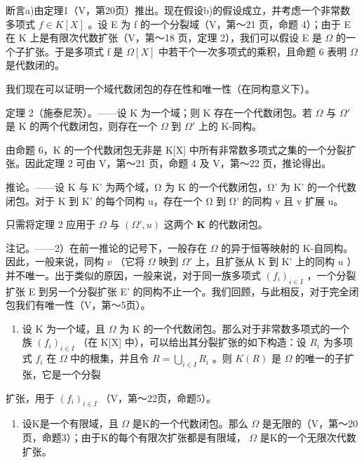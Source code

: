 断言a)由定理1（V，第20页）推出。现在假设b)的假设成立，并考虑一个非常数多项式 \(f \in K[X]\) 。设 E 为 f 的一个分裂域（V，第～21 页，命题 4）；由于 E 在 K 上是有限次代数扩张（V，第～18 页，定理 2），我们可以假设 E 是 \(\Omega\) 的一个子扩张。于是多项式 f 是 \(\Omega[X]\) 中若干个一次多项式的乘积，且命题 6 表明 \(\Omega\) 是代数闭的。

我们现在可以证明一个域代数闭包的存在性和唯一性（在同构意义下）。

定理 2（施泰尼茨）。——设 K 为一个域；则 K 存在一个代数闭包。若 \(\Omega\) 与 \(\Omega'\) 是 K 的两个代数闭包，则存在一个 \(\Omega\) 到 \(\Omega'\) 上的 K-同构。

由命题 6，K 的一个代数闭包无非是 K{[}X{]} 中所有非常数多项式之集的一个分裂扩张。因此定理 2 可由 V，第～21 页，命题 4 及 V，第～22 页，推论得出。

推论。——设 K 与 K' 为两个域，Ω 为 K 的一个代数闭包，Ω' 为 K' 的一个代数闭包。对于 K 到 K' 的每个同构 u，存在一个 Ω 到 Ω' 的同构 v 且 v 扩展 u。

只需将定理 2 应用于 \(\Omega\) 与 \((\Omega', u)\) 这两个 \(\mathbf{K}\) 的代数闭包。

注记。——2）在前一推论的记号下，一般存在 \(\Omega\) 的异于恒等映射的 K-自同构。因此，一般来说，同构 \(v\) （它将 \(\Omega\) 映到 \(\Omega'\) 上，且扩张从 K 到 K' 上的同构 \(u\) ）并不唯一。出于类似的原因，一般来说，对于同一族多项式 \((f_i)_{i \in I}\) ，一个分裂扩张 E 到另一个分裂扩张 E' 的同构不止一个。我们回顾，与此相反，对于完全闭包我们有唯一性（V，第～5页）。

\begin{enumerate}
\def\labelenumi{\arabic{enumi})}
\setcounter{enumi}{2}
\tightlist
\item
  设 K 为一个域，且 \(\Omega\) 为 K 的一个代数闭包。那么对于非常数多项式的一个族 \((f_{i})_{i\in I}\) （在 K{[}X{]} 中），可以给出其分裂扩张的如下构造：设 \(R_{i}\) 为多项式 \(f_{i}\) 在 \(\Omega\) 中的根集，并且令 \(R=\bigcup_{i\in I}R_{i}\) 。则 \(K(R)\) 是 \(\Omega\) 的唯一的子扩张，它是一个分裂
\end{enumerate}

扩张，用于 \((f_i)_{i\in I}\) （V，第～22页，命题5）。

\begin{enumerate}
\def\labelenumi{\arabic{enumi})}
\setcounter{enumi}{3}
\tightlist
\item
  设K是一个有限域，且 \(\Omega\) 是K的一个代数闭包。那么 \(\Omega\) 是无限的（V，第～20页，命题3）；由于K的每个有限次扩张都是有限域， \(\Omega\) 是K的一个无限次代数扩张。
\end{enumerate}


